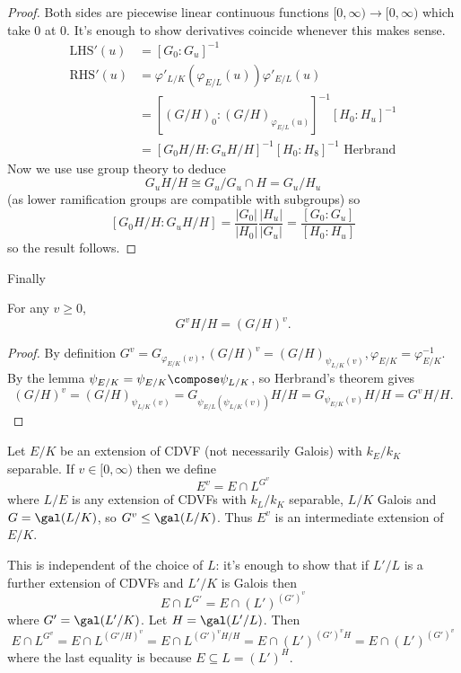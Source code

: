 \documentclass[a4paper]{article}
\begin{document}
\begin{proof}
  Both sides are piecewise linear continuous functions \([0, \infty) \to [0, \infty)\) which take \(0\) at \(0\). It's enough to show derivatives coincide whenever this makes sense.
  \begin{align*}
    \mathrm{LHS}'(u) &= [G_0 : G_u]^{-1} \\
    \mathrm{RHS}'(u) &= \varphi'_{L/K}(\varphi_{E/L}(u)) \varphi'_{E/L}(u) \\
                    &= [(G/H)_0: (G/H)_{\varphi_{E/L}(u)}]^{-1} [H_0 : H_u]^{-1} \\
                    &= [G_0H/H: G_uH/H]^{-1} [H_0: H_8]^{-1}  \text{ Herbrand}
  \end{align*}
  Now we use use group theory to deduce
  \[
    G_uH/H \cong G_u/G_u \cap H = G_u/H_u
  \]
  (as lower ramification groups are compatible with subgroups) so
  \[
    [G_0H/H : G_uH/H] = \frac{|G_0|}{|H_0|} \frac{|H_u|}{|G_u|} = \frac{[G_0: G_u]}{[H_0: H_u]}
  \]
  so the result follows.
\end{proof}

Finally
\begin{theorem}
  For any \(v \geq 0\),
  \[
    G^vH/H = (G/H)^v.
  \]
\end{theorem}

\begin{proof}
  By definition \(G^v = G_{\varphi_{E/K}(v)}, (G/H)^v = (G/H)_{\psi_{L/K}(v)}, \varphi_{E/K} = \varphi^{-1}_{E/K}\). By the lemma \(\psi_{E/K} = \psi_{E/K} \compose \psi_{L/K}\), so Herbrand's theorem gives
  \[
    (G/H)^v = (G/H)_{\psi_{L/K}(v)} = G_{\psi_{E/L}(\psi_{L/K}(v))} H/H
    = G_{\psi_{E/K}(v)} H/H = G^vH/H.
  \]
\end{proof}

\begin{definition}
  Let \(E/K\) be an extension of CDVF (not necessarily Galois) with \(k_E/k_K\) separable. If \(v \in [0, \infty)\) then we define
  \[
    E^v = E \cap L^{G^v}
  \]
  where \(L/E\) is any extension of CDVFs with \(k_L/k_K\) separable, \(L/K\) Galois and \(G = \gal(L/K)\), so \(G^v \leq \gal(L/K)\). Thus \(E^v\) is an intermediate extension of \(E/K\).
\end{definition}

This is independent of the choice of \(L\): it's enough to show that if \(L'/L\) is a further extension of CDVFs and \(L'/K\) is Galois then
\[
  E \cap L^{G'} = E \cap (L')^{(G')^v}
\]
where \(G' = \gal(L'/K)\). Let \(H = \gal(L'/L)\). Then
\[
  E \cap L^{G^v} = E \cap L^{(G'/H)^v} = E \cap L^{(G')^vH/H} = E \cap (L')^{(G')^v H} = E \cap (L')^{(G')^v}
\]
where the last equality is because \(E \subseteq L = (L')^H\).
\end{document}
